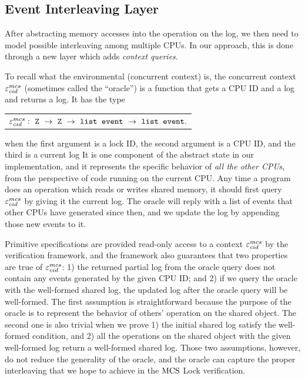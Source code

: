 \subsection{Event Interleaving Layer}
\label{chapter:mcslock:subsec:abstractoperationlayer}

After abstracting memory accesses into the operation on the log, we
then need to model possible interleaving among multiple CPUs. In
our approach, this is done through a new layer which adds \emph{context queries}.

To recall what the environmental (concurrent context) is,
the concurrent context ${\varepsilon}^{mcs}_{cid}$ (sometimes called the ``oracle'') is
a function that gets  a CPU ID and a log and returns a log.
It has the type\newline
\begin{tabular}{P{0.95\textwidth}}
    $\oracle^{mcs}_{cid}:\  \codeinmath{Z}\ \rightarrow \ \codeinmath{Z}\ \rightarrow\ \codeinmath{list event}\ \rightarrow\ \codeinmath{list event}.$\\
\end{tabular}\newline
when the first argument is a lock ID, the second argument is a CPU ID, and the third is a current log 
It is one component of the abstract state in our implementation, and it represents the specific behavior of \emph{all
the other CPUs}, from the perspective of code running on the current
CPU.  Any time a program does an operation which reads or writes
shared memory, it should first query ${\varepsilon}^{mcs}_{cid}$ by giving it the
current log. The oracle will reply with a list of events that other
CPUs have generated since then, and we update the log by appending
those new events to it.

Primitive specifications are provided read-only access to a context
${\varepsilon}^{mcs}_{cid}$ by the verification framework, and the framework also
guarantees that two properties are true of ${\varepsilon}^{mcs}_{cid}$: 1) the returned
partial log from the oracle query does not contain any events
generated by the given CPU ID; and 2) if we query the oracle with the
well-formed shared log, the updated log after the oracle query will
be well-formed.
The first assumption is straightforward because the purpose of the oracle is to represent the behavior of others' operation on the shared object.
The second one is also trivial when we prove 1) the initial shared log satisfy the well-formed condition, and 2) all the operations on the shared object with the given well-formed log return a well-formed shared log.
Those two assumptions, however, do not reduce the generality of the oracle, and the oracle can capture the proper interleaving that we hope to achieve in the $\mathrm{MCS}$ Lock verification.

